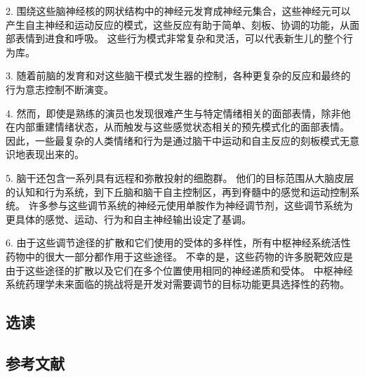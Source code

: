 2. 围绕这些脑神经核的网状结构中的神经元发育成神经元集合，这些神经元可以产生自主神经和运动反应的模式，这些反应有助于简单、刻板、协调的功能，从面部表情到进食和呼吸。 这些行为模式非常复杂和灵活，可以代表新生儿的整个行为库。 

3. 随着前脑的发育和对这些脑干模式发生器的控制，各种更复杂的反应和最终的行为意志控制不断演变。 

4. 然而，即使是熟练的演员也发现很难产生与特定情绪相关的面部表情，除非他在内部重建情绪状态，从而触发与这些感觉状态相关的预先模式化的面部表情。 因此，一些最复杂的人类情绪和行为是通过脑干中运动和自主反应的刻板模式无意识地表现出来的。 

5. 脑干还包含一系列具有远程和弥散投射的细胞群。 他们的目标范围从大脑皮层的认知和行为系统，到下丘脑和脑干自主控制区，再到脊髓中的感觉和运动控制系统。 许多参与这些调节系统的神经元使用单胺作为神经调节剂，这些调节系统为更具体的感觉、运动、行为和自主神经输出设定了基调。 

6. 由于这些调节途径的扩散和它们使用的受体的多样性，所有中枢神经系统活性药物中的很大一部分都作用于这些途径。 不幸的是，这些药物的许多脱靶效应是由于这些途径的扩散以及它们在多个位置使用相同的神经递质和受体。 中枢神经系统药理学未来面临的挑战将是开发对需要调节的目标功能更具选择性的药物。

\subsection{选读}
\subsection{参考文献}